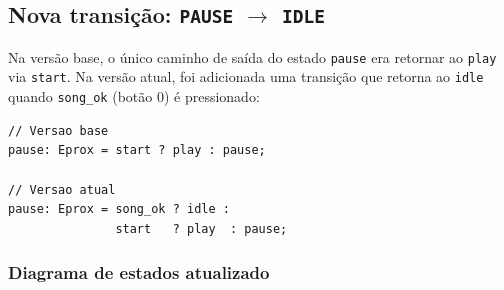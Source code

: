 \documentclass[12pt, a4paper]{article}
\newcommand{\vsig}[1]{\texttt{#1}}
\begin{document}
\subsection{Nova transição: \texttt{PAUSE} $\to$ \texttt{IDLE}}

Na versão base, o único caminho de saída do estado \texttt{pause} era retornar
ao \texttt{play} via \vsig{start}. Na versão atual, foi adicionada uma
transição que retorna ao \texttt{idle} quando \vsig{song\_ok} (botão 0) é
pressionado:

\begin{lstlisting}[caption={Lógica de próximo estado — estado pause}]
// Versao base
pause: Eprox = start ? play : pause;

// Versao atual
pause: Eprox = song_ok ? idle :
               start   ? play  : pause;
\end{lstlisting}

\subsubsection{Diagrama de estados atualizado}
\end{document}
